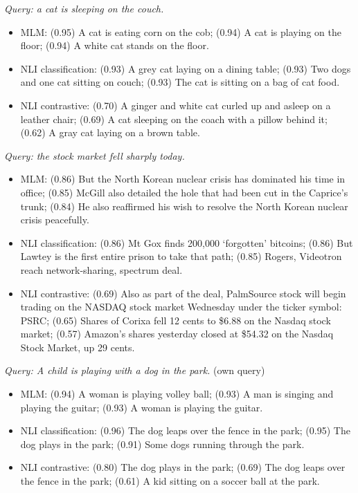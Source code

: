 \documentclass[12pt]{article}
\theoremstyle{definition}
\begin{document}
{\begin{enumerate}[label=\textbf{2.3.\arabic*}, leftmargin=*]
    \textit{Query: a cat is sleeping on the couch.}
    \begin{itemize}
        \item MLM: (0.95) A cat is eating corn on the cob; (0.94) A cat is playing on the floor; (0.94) A white cat stands on the floor.
        \item NLI classification: (0.93) A grey cat laying on a dining table; (0.93) Two dogs and one cat sitting on couch; (0.93) The cat is sitting on a bag of cat food.
        \item NLI contrastive: (0.70) A ginger and white cat curled up and asleep on a leather chair; (0.69) A cat sleeping on the coach with a pillow behind it; (0.62) A gray cat laying on a brown table.
    \end{itemize}

    \textit{Query: the stock market fell sharply today.}
    \begin{itemize}
        \item MLM: (0.86) But the North Korean nuclear crisis has dominated his time in office; (0.85) McGill also detailed the hole that had been cut in the Caprice's trunk; (0.84) He also reaffirmed his wish to resolve the North Korean nuclear crisis peacefully.
        \item NLI classification: (0.86) Mt Gox finds 200,000 `forgotten' bitcoins; (0.86) But Lawtey is the first entire prison to take that path; (0.85) Rogers, Videotron reach network-sharing, spectrum deal.
        \item NLI contrastive: (0.69) Also as part of the deal, PalmSource stock will begin trading on the NASDAQ stock market Wednesday under the ticker symbol: PSRC; (0.65) Shares of Corixa fell 12 cents to \$6.88 on the Nasdaq stock market; (0.57) Amazon's shares yesterday closed at \$54.32 on the Nasdaq Stock Market, up 29 cents.
    \end{itemize}

    \textit{Query: A child is playing with a dog in the park.} (own query)
    \begin{itemize}
        \item MLM: (0.94) A woman is playing volley ball; (0.93) A man is singing and playing the guitar; (0.93) A woman is playing the guitar.
        \item NLI classification: (0.96) The dog leaps over the fence in the park; (0.95) The dog plays in the park; (0.91) Some dogs running through the park.
        \item NLI contrastive: (0.80) The dog plays in the park; (0.69) The dog leaps over the fence in the park; (0.61) A kid sitting on a soccer ball at the park.
    \end{itemize}


\end{enumerate}}
\end{document}
